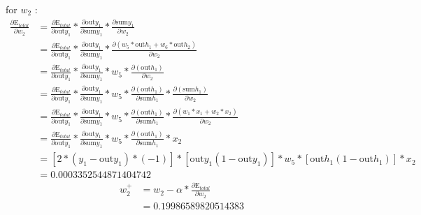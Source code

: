 \documentclass[a4paper, article, oneside, USenglish, IN5460]{memoir}
\begin{document}
{\newline
for $w_2$ :
\begin{equation}
\begin{aligned}
\frac{\partial \text{E}_{total}  }{\partial w_2} &= \frac{\partial \text{E}_{total}}{\partial \text{out}y_1} *\frac{\partial  \text{out}y_1}{\partial \text{sum}y_1}*\frac{\partial \text{sum}y_1}{\partial  w_2} \\
&= \frac{\partial \text{E}_{total}}{\partial \text{out}y_1} *\frac{\partial  \text{out}y_1}{\partial \text{sum}y_1}*\frac{\partial ( w_5*\text{out}h_1 + w_6*\text{out}h_2 )} {\partial w_2} \\
&= \frac{\partial \text{E}_{total}}{\partial \text{out}y_1} * \frac{\partial \text{out}y_1}{\partial \text{sum}y_1} *{w_5}* \frac{\partial ( \text{out}h_1 )} {\partial w_2}\\
&= \frac{\partial \text{E}_{total}}{\partial \text{out}y_1} * \frac{\partial \text{out}y_1}{\partial \text{sum}y_1} *{w_5}* \frac{\partial ( \text{out}h_1 )}{\partial \text{sum}h_1} * \frac{\partial ( \text{sum}h_1)}{\partial w_2}\\
&= \frac{\partial \text{E}_{total}}{\partial \text{out}y_1} * \frac{\partial \text{out}y_1}{\partial \text{sum}y_1} *{w_5}* \frac{\partial ( \text{out}h_1 )}{\partial \text{sum}h_1} * \frac{\partial ( w_1*x_1 + w_2*x_2)}{\partial w_2}\\
&= \frac{\partial \text{E}_{total}}{\partial \text{out}y_1} * \frac{\partial \text{out}y_1}{\partial \text{sum}y_1} *{w_5}* \frac{\partial ( \text{out}h_1 )}{\partial \text{sum}h_1} *  {x_2}\\
&= [2*(y_1 -\text{out}y_1)*(-1)] * [\text{out}y_1(1-\text{out}y_1)] *{w_5}* [\text{out}h_1 (1-\text{out}h_1)]*  {x_2}\\
& = 0.0003352544871404742
\end{aligned}
\end{equation}
\begin{equation}
\begin{aligned}
w^+_2 &= w_2 - \alpha * \frac{\partial \text{E}_{total}  }{\partial w_2} \\
& = 0.19986589820514383
\end{aligned}
\end{equation}


}
\end{document}
